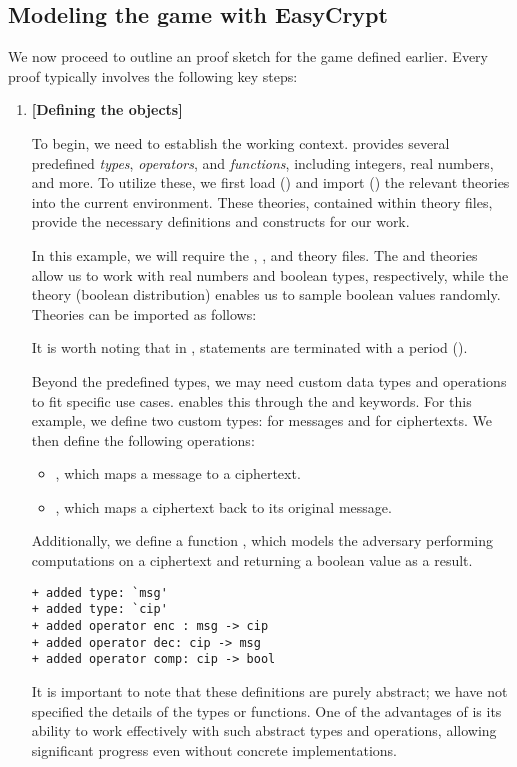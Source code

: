 \subsection{Modeling the \INDRoR game with EasyCrypt}
We now proceed to outline an \EasyCrypt proof sketch for the game defined earlier. Every \EasyCrypt proof typically involves the following key steps:
\begin{enumerate}
	\item \textbf{[Defining the objects]}
	
	To begin, we need to establish the working context. \EasyCrypt provides several predefined \emph{types}, \emph{operators}, and \emph{functions}, including integers, real numbers, and more. To utilize these, we first load () and import () the relevant theories into the current environment. These theories, contained within theory files, provide the necessary definitions and constructs for our work.
	
	In this example, we will require the , , and  theory files. The  and  theories allow us to work with real numbers and boolean types, respectively, while the  theory (boolean distribution) enables us to sample boolean values randomly. Theories can be imported as follows:\\
	
	It is worth noting that in \EasyCrypt, statements are terminated with a period ().
	
	Beyond the predefined types, we may need custom data types and operations to fit specific use cases. \EasyCrypt enables this through the  and  keywords. For this example, we define two custom types:  for messages and  for ciphertexts. We then define the following operations:
	\begin{itemize}
		\item {}, which maps a message to a ciphertext.
		\item {}, which maps a ciphertext back to its original message.
	\end{itemize}
	Additionally, we define a function , which models the adversary performing computations on a ciphertext and returning a boolean value as a result.
	\newpage
	\begin{lstlisting}[style=normal]
+ added type: `msg'
+ added type: `cip'
+ added operator enc : msg -> cip
+ added operator dec: cip -> msg
+ added operator comp: cip -> bool
	\end{lstlisting}
	It is important to note that these definitions are purely abstract; we have not specified the details of the types or functions. One of the advantages of \EasyCrypt is its ability to work effectively with such abstract types and operations, allowing significant progress even without concrete implementations.
	

\end{enumerate}
